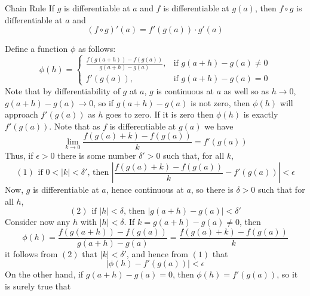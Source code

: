\documentclass[12pt]{report}
\begin{document}
\begin{thm}{Chain Rule}{}
    If $g$ is differentiable at $a$ and $f$ is differentiable at $g(a)$, then $f\circ g$ is differentiable at $a$ and $$(f\circ g)'(a) = f'(g(a))\cdot g'(a)$$
\end{thm}
\begin{proof*}{}{}
    Define a function $\phi$ as follows: \begin{equation}
        \phi(h) = \left\{\begin{array}{ll}
            \frac{f(g(a+h)) - f(g(a))}{g(a+h)-g(a)}, & \text{if } g(a+h)-g(a) \neq 0 \\
            f'(g(a)), & \text{if } g(a+h) - g(a) = 0
        \end{array}\right.
    \end{equation}
    Note that by differentiability of $g$ at $a$, $g$ is continuous at $a$ as well so as $h\rightarrow 0$, $g(a+h)-g(a)\rightarrow 0$, so if $g(a+h)-g(a)$ is not zero, then $\phi(h)$ will approach $f'(g(a))$ as $h$ goes to zero. If it is zero then $\phi(h)$ is exactly $f'(g(a))$. Note that as $f$ is differentiable at $g(a)$ we have $$\lim\limits_{k\rightarrow 0}\frac{f(g(a) + k) - f(g(a))}{k} = f'(g(a))$$
    Thus, if $\epsilon > 0$ there is some number $\delta' > 0$ such that, for all $k$, \begin{equation*}
        (1)\hspace{5pt}\text{if $0 < |k| < \delta'$, then } \left|\frac{f(g(a) + k) - f(g(a))}{k} - f'(g(a))\right| < \epsilon
    \end{equation*}
    Now, $g$ is differentiable at $a$, hence continuous at $a$, so there is $\delta > 0$ such that for all $h$, \begin{equation*}
        (2)\hspace{5pt}\text{if $|h| < \delta$, then } |g(a+h) - g(a)| < \delta'
    \end{equation*}
    Consider now any $h$ with $|h| < \delta$. If $k = g(a+h) - g(a) \neq 0$, then \begin{equation*}
        \phi(h) = \frac{f(g(a+h)) - f(g(a))}{g(a+h) - g(a)} = \frac{f(g(a)+k) - f(g(a))}{k}
    \end{equation*}
    it follows from $(2)$ that $|k| < \delta'$, and hence from $(1)$ that \begin{equation*}
        |\phi(h) - f'(g(a))| < \epsilon
    \end{equation*}
    On the other hand, if $g(a+h) - g(a) = 0$, then $\phi(h) = f'(g(a))$, so it is surely true that \begin{equation*}

\end{equation*}
\end{proof*}
\end{document}
